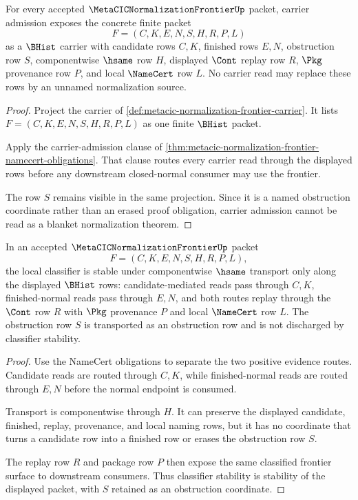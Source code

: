 \begin{theorem}
\label{thm:metacic-normalization-frontier-carrier-rows}
For every accepted $\MetaCICNormalizationFrontierUp$ packet, carrier admission exposes the concrete finite packet
$$
F=(C,K,E,N,S,H,R,P,L)
$$
as a $\BHist$ carrier with candidate rows $C,K$, finished rows $E,N$, obstruction row $S$, componentwise $\hsame$ row $H$, displayed $\Cont$ replay row $R$, $\Pkg$ provenance row $P$, and local $\NameCert$ row $L$. No carrier read may replace these rows by an unnamed normalization source.
\end{theorem}
\begin{proof}
Project the carrier of \autoref{def:metacic-normalization-frontier-carrier}. It lists $F=(C,K,E,N,S,H,R,P,L)$ as one finite $\BHist$ packet.

Apply the carrier-admission clause of \autoref{thm:metacic-normalization-frontier-namecert-obligations}. That clause routes every carrier read through the displayed rows before any downstream closed-normal consumer may use the frontier.

The row $S$ remains visible in the same projection. Since it is a named obstruction coordinate rather than an erased proof obligation, carrier admission cannot be read as a blanket normalization theorem.
\end{proof}

\begin{theorem}
\label{thm:metacic-normalization-frontier-classifier-stability}
In an accepted $\MetaCICNormalizationFrontierUp$ packet
$$
F=(C,K,E,N,S,H,R,P,L),
$$
the local classifier is stable under componentwise $\hsame$ transport only along the displayed $\BHist$ rows: candidate-mediated reads pass through $C,K$, finished-normal reads pass through $E,N$, and both routes replay through the $\Cont$ row $R$ with $\Pkg$ provenance $P$ and local $\NameCert$ row $L$. The obstruction row $S$ is transported as an obstruction row and is not discharged by classifier stability.
\end{theorem}
\begin{proof}
Use the NameCert obligations to separate the two positive evidence routes. Candidate reads are routed through $C,K$, while finished-normal reads are routed through $E,N$ before the normal endpoint is consumed.

Transport is componentwise through $H$. It can preserve the displayed candidate, finished, replay, provenance, and local naming rows, but it has no coordinate that turns a candidate row into a finished row or erases the obstruction row $S$.

The replay row $R$ and package row $P$ then expose the same classified frontier surface to downstream consumers. Thus classifier stability is stability of the displayed packet, with $S$ retained as an obstruction coordinate.
\end{proof}

